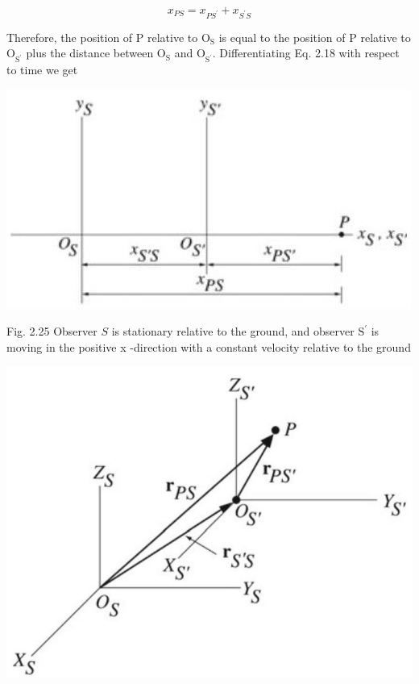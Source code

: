 \documentclass[10pt]{article}
\begin{document}
\begin{equation*}
x_{P S}=x_{P S^{\prime}}+x_{S^{\prime} S} \tag{2.18}
\end{equation*}


Therefore, the position of P relative to $\mathrm{O}_{\mathrm{S}}$ is equal to the position of P relative to $\mathrm{O}_{\mathrm{S}^{\prime}}$ plus the distance between $\mathrm{O}_{\mathrm{S}}$ and $\mathrm{O}_{\mathrm{S}^{\prime}}$. Differentiating Eq. 2.18 with respect to time we get

\begin{center}
\includegraphics[max width=\textwidth]{2024_09_13_db1f357d2aad0a03eb2eg-041}
\end{center}

Fig. 2.25 Observer $S$ is stationary relative to the ground, and observer $\mathrm{S}^{\prime}$ is moving in the positive x -direction with a constant velocity relative to the ground

\begin{center}
\includegraphics[max width=\textwidth]{2024_09_13_db1f357d2aad0a03eb2eg-041(1)}
\end{center}
\end{document}
